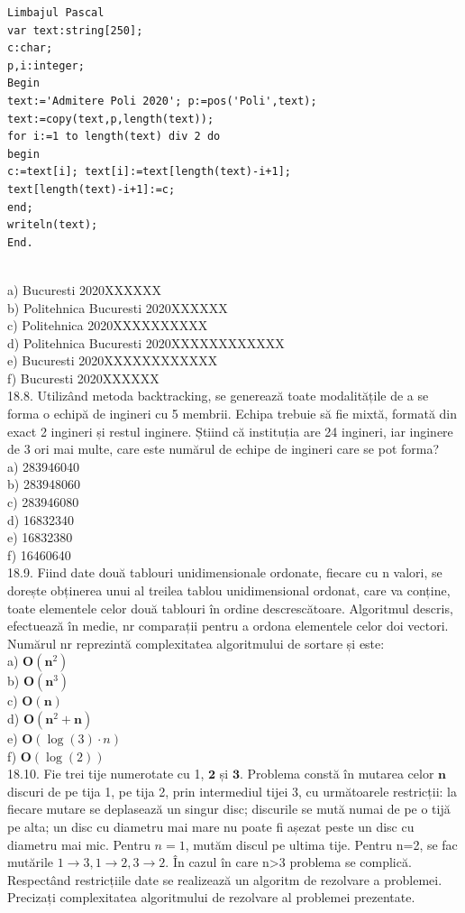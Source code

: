 {{\begin{verbatim}
Limbajul Pascal 
var text:string[250]; 
c:char; 
p,i:integer; 
Begin 
text:='Admitere Poli 2020'; p:=pos('Poli',text); 
text:=copy(text,p,length(text)); 
for i:=1 to length(text) div 2 do 
begin 
c:=text[i]; text[i]:=text[length(text)-i+1]; 
text[length(text)-i+1]:=c; 
end; 
writeln(text); 
End. 
\end{verbatim}
\\
a) Bucuresti 2020XXXXXX
\\
b) Politehnica Bucuresti 2020XXXXXX
\\
c) Politehnica 2020XXXXXXXXXX
\\
d) Politehnica Bucuresti 2020XXXXXXXXXXXX
\\
e) Bucuresti 2020XXXXXXXXXXXX
\\
f) Bucuresti 2020XXXXXX
\\
18.8. Utilizând metoda backtracking, se generează toate modalitățile de a se forma o echipă de ingineri cu 5 membrii. Echipa trebuie să fie mixtă, formată din exact 2 ingineri și restul inginere. Știind că instituția are 24 ingineri, iar inginere de 3 ori mai multe, care este numărul de echipe de ingineri care se pot forma?
\\
a) 283946040
\\
b) 283948060
\\
c) 283946080
\\
d) 16832340
\\
e) 16832380
\\
f) 16460640 
\\
18.9. Fiind date două tablouri unidimensionale ordonate, fiecare cu n valori, se dorește obținerea unui al treilea tablou unidimensional ordonat, care va conține, toate elementele celor două tablouri în ordine descrescătoare. Algoritmul descris, efectuează în medie, nr comparații pentru a ordona elementele celor doi vectori. Numărul nr reprezintă complexitatea algoritmului de sortare și este:
\\
a) $\mathbf{O}\left(\mathbf{n}^{2}\right)$
\\
b) $\mathbf{O}\left(\mathbf{n}^{3}\right)$
\\
c) $\mathbf{O}(\mathbf{n})$
\\
d) $\mathbf{O}\left(\mathbf{n}^{2}+\mathbf{n}\right)$
\\
e) $\mathbf{O}(\log (3) \cdot n)$
\\
f) $\mathbf{O}(\log (2))$
\\
18.10. Fie trei tije numerotate cu 1, $\mathbf{2}$ și $\mathbf{3}$. Problema constă în mutarea celor $\mathbf{n}$ discuri de pe tija 1, pe tija 2, prin intermediul tijei 3, cu următoarele restricții: la fiecare mutare se deplasează un singur disc; discurile se mută numai de pe o tijă pe alta; un disc cu diametru mai mare nu poate fi așezat peste un disc cu diametru mai mic. Pentru $n=1$, mutăm discul pe ultima tije. Pentru n=2, se fac mutările $1 \rightarrow 3,1 \rightarrow 2,3 \rightarrow 2$. În cazul în care n>3 problema se complică. Respectând restricțiile date se realizează un algoritm de rezolvare a problemei. Precizați complexitatea algoritmului de rezolvare al problemei prezentate.
}}
